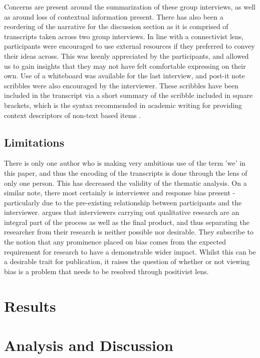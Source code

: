 \documentclass{l4proj}
\begin{document}
Concerns are present around the summarization of these group interviews, as well as around loss of contextual information present. There has also been a reordering of the narrative for the discussion section as it is comprised of transcripts taken across two group interviews. In line with a connectivist lens, participants were encouraged to use external resources if they preferred to convey their ideas across. This was keenly appreciated by the participants, and allowed us to gain insights that they may not have felt comfortable expressing on their own. Use of a whiteboard was available for the last interview, and post-it note scribbles were also encouraged by the interviewer. These scribbles have been included in the transcript via a short summary of the scribble included in square brackets, which is the syntax recommended in academic writing for providing context descriptors of non-text based items \citep{AI_2023}.


\subsection{Limitations}

There is only one author who is making very ambitious use of the term 'we' in this paper, and thus the encoding of the transcripts is done through the lens of only one person. This has decreased the validity of the thematic analysis. On a similar note, there most certainly is interviewer and response bias present - particularly due to the pre-existing relationship between participants and the interviewer. \citet{galdas2017revisiting} argues that interviewers carrying out qualitative research are an integral part of the process as well as the final product, and thus separating the researcher from their research is neither possible nor desirable. They subscribe to the notion that any prominence placed on bias comes from the expected requirement for research to have a demonstrable wider impact. Whilst this can be a desirable trait for publication, it raises the question of whether or not viewing bias is a problem that needs to be resolved through positivist lens.

\section{Results}

\section{Analysis and Discussion}
\end{document}
